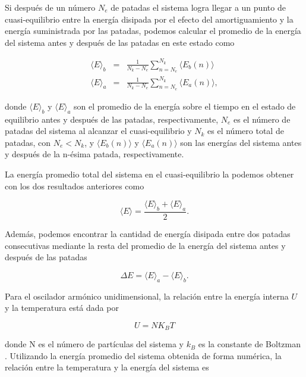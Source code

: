 \documentclass[letterpaper,12pt,oneside]{book}
\begin{document}
	Si después de un número $N_e$ de patadas el sistema logra llegar a un punto de cuasi-equilibrio entre la energía disipada por el efecto del amortiguamiento y la energía suministrada por las patadas, podemos calcular el promedio de la energía del sistema antes y después de las patadas en este estado como
	
	\begin{eqnarray}
	\langle E \rangle_b &=& \frac{1}{N_k - N_e} \sum_{n = N_e}^{N_k}  \langle E_b(n)\rangle \label{Eq.MHBefore}\\ 
	\langle E \rangle_a &=& \frac{1}{N_k - N_e} \sum_{n = N_e}^{N_k}  \langle E_a(n) \rangle , \label{Eq.MHafter}
	\end{eqnarray}
	
	\noindent donde $\langle E \rangle_b$ y $ \langle E \rangle_a $ son el promedio de la energía sobre el tiempo en el estado de equilibrio antes y después de las patadas, respectivamente, $N_e$ es el número de patadas del sistema al alcanzar el cuasi-equilibrio y $N_k$ es el número total de patadas, con $N_e<N_k$, y $\langle E_b(n) \rangle$ y $\langle E_a(n) \rangle$ son las energías del sistema antes y después de la n-ésima patada, respectivamente.
	
	La energía promedio total del sistema en el cuasi-equilibrio la podemos obtener con los dos resultados anteriores como
	
	\begin{equation}\label{Eq.MeanET}
	\langle E \rangle = \frac{\langle E \rangle_b + \langle E \rangle_a}{2}.
	\end{equation}
	
	Además, podemos encontrar la cantidad de energía disipada entre dos patadas consecutivas mediante la resta del promedio de la energía del sistema antes y después de las patadas
	
	\begin{equation}\label{Eq.DeltaE}
	\Delta E = \langle E \rangle_a - \langle E \rangle_b.
	\end{equation}
	
	Para el oscilador armónico unidimensional, la relación entre la energía interna $U$ y la temperatura está dada por
	
	\begin{equation} \label{Eq.EnergiaInterna}
	U = N K_B T
	\end{equation}
	
	\noindent donde N es el número de partículas del sistema y $k_B$ es la constante de Boltzman \cite{CursoFisEstadistica}. Utilizando la energía promedio del sistema obtenida de forma numérica, la relación entre la temperatura y la energía del sistema es
	
\end{document}
